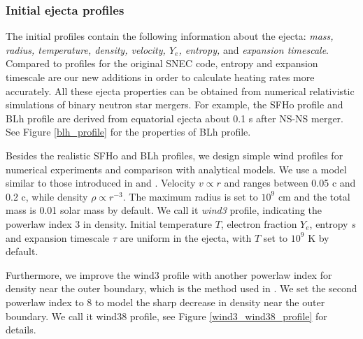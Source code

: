\documentclass[fleqn,usenatbib]{mnras}
\begin{document}
   \subsubsection{Initial ejecta profiles}
    The initial profiles contain the following information about the ejecta: {\it mass, radius, temperature, density, velocity, $Y_e$, entropy, }and {\it expansion timescale}. Compared to profiles for the original SNEC code, entropy and expansion timescale are our new additions in order to calculate heating rates more accurately. All these ejecta properties can be obtained from numerical relativistic simulations of binary neutron star mergers. For example, the SFHo profile and BLh profile are derived from equatorial ejecta about 0.1 s after NS-NS merger. See Figure \ref{blh_profile} for the properties of BLh profile. 
    
    Besides the realistic SFHo and BLh profiles, we design simple wind profiles for numerical experiments and comparison with analytical models. We use a model similar to those introduced in \cite{metzger2010electromagnetic} and \cite{tanaka2013radiative}. Velocity $v \propto r$ and ranges between 0.05 c and 0.2 c, while density $\rho \propto r^{-3}$. The maximum radius is set to $10^{9}$ cm and the total mass is 0.01 solar mass by default. We call it {\it wind3} profile, indicating the powerlaw index 3 in density. Initial temperature $T$, electron fraction $Y_e$, entropy $s$ and expansion timescale $\tau$ are uniform in the ejecta, with $T$ set to $10^9$ K by default. 
    
    Furthermore, we improve the wind3 profile with another powerlaw index for density near the outer boundary, which is the method used in \cite{ishizaki2021fallback}. We set the second powerlaw index to 8 to model the sharp decrease in density near the outer boundary. We call it wind38 profile,  see Figure \ref{wind3_wind38_profile} for details.
   
    
    
\end{document}
